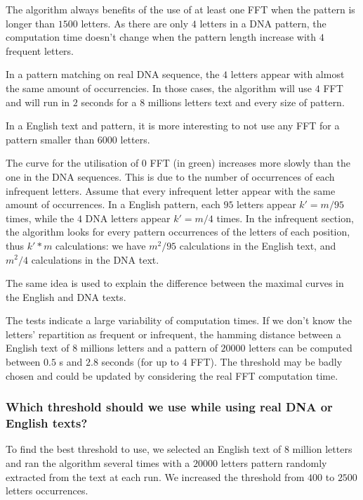 \documentclass[preprint,12pt]{elsarticle}
\begin{document}
The algorithm always benefits of the use of at least one FFT when the pattern is longer than $1500$ letters.
As there are only $4$ letters in a DNA pattern,
the computation time doesn't change when the pattern length increase with $4$ frequent letters.

In a pattern matching on real DNA sequence, the $4$ letters appear with almost the same amount of occurrencies.
In those cases,
the algorithm will use $4$ FFT and will run in $2$ seconds
for a $8$ millions letters text and every size of pattern.

In a English text and pattern, it is more interesting to not use any FFT for a pattern smaller than $6000$ letters.

The curve for the utilisation of $0$ FFT (in green) increases more slowly than the one in the DNA sequences.
This is due to the number of occurrences of each infrequent letters.
Assume that every infrequent letter appear with the same amount of occurrences.
In a English pattern, each $95$ letters appear $k'=m/95$ times,
while the $4$ DNA letters appear $k'=m/4$ times.
In the infrequent section, the algorithm looks for every pattern occurrences of the letters of each position,
thus $k'*m$ calculations:
we have $m^2/95$ calculations in the English text,
and $m^2/4$ calculations in the DNA text. 

The same idea is used to explain the difference between the maximal curves in the English and DNA texts.


The tests indicate a large variability of computation times.
If we don't know the letters' repartition as frequent or infrequent,
the hamming distance between a English text of $8$ millions letters
and a pattern of $20 000$ letters can be computed between $0.5$ s and $2.8$ seconds
(for up to $4$ FFT).
The threshold may be badly chosen and could be updated by considering the real FFT computation time.




\subsubsection*{Which threshold should we use while using real DNA or English texts?}

To find the best threshold to use,
we selected an English text of $8$ million letters
and ran the algorithm several times
with a $20 000$ letters pattern
randomly extracted from the text at each run.
We increased the threshold from $400$ to $2500$ letters occurrences.%
\end{document}
